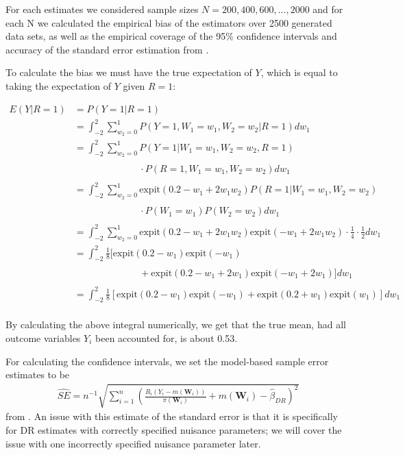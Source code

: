 \documentclass[12pt,twoside]{article}
\newcommand{\expit}{\text{expit}}
\begin{document}
For each estimates we considered sample sizes $N = 200, 400, 600, ..., 2000$ and for each N we calculated the empirical bias of the estimators over 2500 generated data sets, as well as the empirical coverage of the 95\% confidence intervals and accuracy of the standard error estimation from \citet{lunceford_davidian}.

To calculate the bias we must have the true expectation of $Y$, which is equal to taking the expectation of $Y$ given $R = 1$:

\begin{align*}
    E(Y|R = 1) &= P(Y = 1|R = 1)\\
    &= \int_{-2}^{2} \sum_{w_2 = 0}^{1} P(Y = 1, W_1 = w_1, W_2 = w_2|R = 1) dw_1 \\
    & = \int_{-2}^{2} \sum_{w_2 = 0}^{1} P(Y = 1|W_1 = w_1, W_2 = w_2, R = 1) \\
    & \phantom{ = \int_{-2}^{2} \sum_{w_2 = 0}^{1}} \cdot P(R = 1, W_1 = w_1, W_2 = w_2)dw_1 \\
    & = \int_{-2}^{2} \sum_{w_2 = 0}^{1} \expit(0.2 - w_1 + 2w_1w_2)P(R = 1|W_1 = w_1, W_2 = w_2) \\
    &\phantom{ = \int_{-2}^{2} \sum_{w_2 = 0}^{1}} \cdot P(W_1 = w_1)P(W_2 = w_2)dw_1 \\
    & = \int_{-2}^{2} \sum_{w_2 = 0}^{1} \expit(0.2 - w_1 + 2w_1w_2)\expit(-w_1+2w_1w_2) \cdot \frac{1}{4}\cdot \frac{1}{2}dw_1 \\
    & = \int_{-2}^{2} \frac{1}{8}[\expit(0.2 - w_1)\expit(-w_1) \\
    &\phantom{ = \int_{-2}^{2} \sum_{w_2 = 0}^{1}} +\expit(0.2 - w_1 + 2w_1)\expit(-w_1+2w_1)]dw_1 \\
    & = \int_{-2}^{2} \frac{1}{8}[\expit(0.2 - w_1)\expit(-w_1) +\expit(0.2 + w_1)\expit(w_1)]dw_1 \\
\end{align*}

By calculating the above integral numerically, we get that the true mean, had all outcome variables $Y_i$ been accounted for, is about 0.53.

For calculating the confidence intervals, we set the model-based sample error estimates to be 
\begin{align*}
    \hat{SE} = n^{-1} \sqrt{\sum_{i=1}^n \left(\frac{R_i(Y_i - m(\mathbf{W}_i))}{\pi(\mathbf{W}_i)} + m(\mathbf{W}_i) - \hat{\beta}_{DR}\right)^2}
\end{align*}
from \citet{lunceford_davidian}. An issue with this estimate of the standard error is that it is specifically for DR estimates with correctly specified nuisance parameters; we will cover the issue with one incorrectly specified nuisance parameter later.
\end{document}
